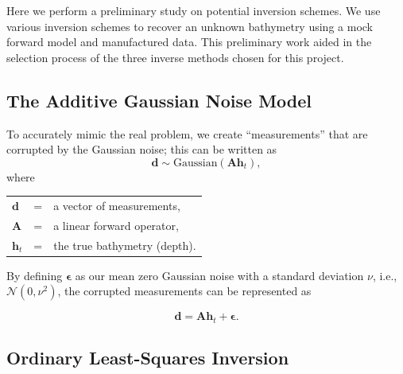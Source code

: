 
Here we perform a preliminary study on potential inversion schemes. We use various inversion schemes to recover an unknown bathymetry using a mock forward model and manufactured data. This preliminary work aided in the selection process of the three inverse methods chosen for this project.

\subsection{The Additive Gaussian Noise Model} \label{Gaussian_noise}
To accurately mimic the real problem, we create ``measurements'' that are corrupted by the Gaussian noise; this can be written as 
\begin{equation}
\mathbf{d} \sim \text{Gaussian}( \mathbf{A} \mathbf{h}_t),
\end{equation}
\vspace{0.3cm}
where\\
\begin{tabular}{l c l}
$\mathbf{d}$ &=& a vector of measurements,\\
$\mathbf{A}$ &=& a linear forward operator,\\
$\mathbf{h}_t$ &=& the true bathymetry (depth). 
\end{tabular}

\vspace{0.3cm}
\noindent By defining $\boldsymbol{\epsilon}$ as our mean zero Gaussian noise with a standard deviation $\nu$, i.e., $\mathcal{N}(0, \nu^2)$, the corrupted measurements can be represented as

$$
\mathbf{d} = \mathbf{A} \mathbf{h}_t + \boldsymbol{\epsilon}.
$$



\subsection{Ordinary Least-Squares Inversion}


